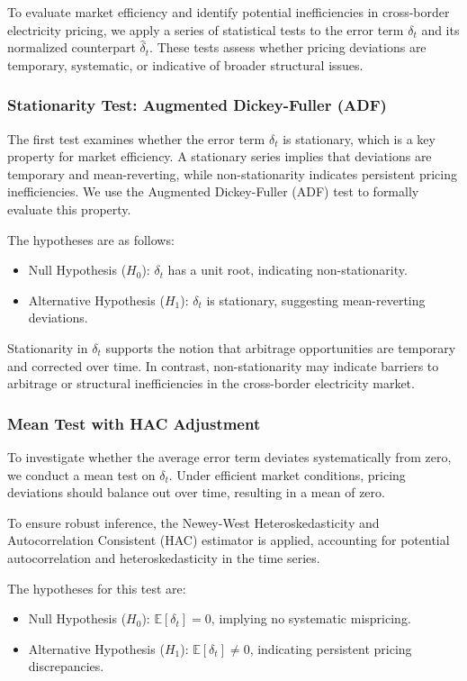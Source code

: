 \documentclass[12pt]{article}
\begin{document}
To evaluate market efficiency and identify potential inefficiencies in cross-border electricity pricing, we apply a series of statistical tests to the error term $\delta_t$ and its normalized counterpart $\hat{\delta}_t$. These tests assess whether pricing deviations are temporary, systematic, or indicative of broader structural issues.

\subsubsection*{Stationarity Test: Augmented Dickey-Fuller (ADF)}

The first test examines whether the error term $\delta_t$ is stationary, which is a key property for market efficiency. A stationary series implies that deviations are temporary and mean-reverting, while non-stationarity indicates persistent pricing inefficiencies. We use the Augmented Dickey-Fuller (ADF) test to formally evaluate this property.

The hypotheses are as follows:
\begin{itemize}
    \item Null Hypothesis ($H_0$): $\delta_t$ has a unit root, indicating non-stationarity.
    \item Alternative Hypothesis ($H_1$): $\delta_t$ is stationary, suggesting mean-reverting deviations.
\end{itemize}

Stationarity in $\delta_t$ supports the notion that arbitrage opportunities are temporary and corrected over time. In contrast, non-stationarity may indicate barriers to arbitrage or structural inefficiencies in the cross-border electricity market.

\subsubsection*{Mean Test with HAC Adjustment}

To investigate whether the average error term deviates systematically from zero, we conduct a mean test on $\delta_t$. Under efficient market conditions, pricing deviations should balance out over time, resulting in a mean of zero.

To ensure robust inference, the Newey-West Heteroskedasticity and Autocorrelation Consistent (HAC) estimator is applied, accounting for potential autocorrelation and heteroskedasticity in the time series.

The hypotheses for this test are:
\begin{itemize}
    \item Null Hypothesis ($H_0$): $\mathbb{E}[\delta_t] = 0$, implying no systematic mispricing.
    \item Alternative Hypothesis ($H_1$): $\mathbb{E}[\delta_t] \neq 0$, indicating persistent pricing discrepancies.
\end{itemize}
\end{document}
